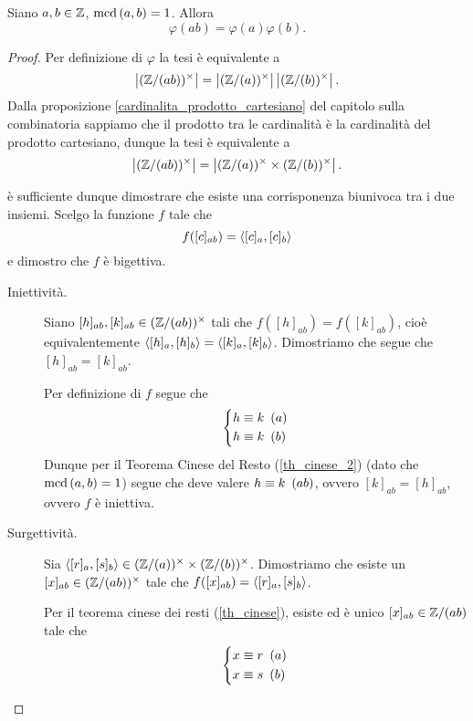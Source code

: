 \begin{proposition}
    Siano $a, b \in \mathbb{Z}$, $\operatorname{mcd}\left(a, b\right) = 1$. Allora \begin{equation}
        \varphi(ab) = \varphi(a)\varphi(b).
    \end{equation}
\end{proposition}
\begin{proof}
    Per definizione di $\varphi$ la tesi è equivalente a \[
        \left|(\mathbb{Z}/(ab))^{\times}\right| = \left|(\mathbb{Z}/(a))^{\times}\right|\left|(\mathbb{Z}/(b))^{\times}\right|.
    \]
    Dalla proposizione \ref{cardinalita_prodotto_cartesiano} del capitolo sulla combinatoria sappiamo che il prodotto tra le cardinalità è la cardinalità del prodotto cartesiano, dunque la tesi è equivalente a \[
        \left|(\mathbb{Z}/(ab))^{\times}\right| = \left|(\mathbb{Z}/(a))^{\times}\times(\mathbb{Z}/(b))^{\times}\right|.
    \]

    è sufficiente dunque dimostrare che esiste una corrisponenza biunivoca tra i due insiemi. Scelgo la funzione $f$ tale che \[
        f([c]_{ab}) = \left\langle [c]_a, [c]_b \right\rangle    
    \] e dimostro che $f$ è bigettiva.

    \begin{description}
        \item[Iniettività.] Siano $[h]_{ab}, [k]_{ab} \in (\mathbb{Z}/(ab))^{\times}$ tali che $f([h]_{ab}) = f([k]_{ab})$, cioè equivalentemente $\left\langle [h]_a, [h]_b \right\rangle = \left\langle [k]_a, [k]_b \right\rangle$. Dimostriamo che segue che $[h]_{ab} = [k]_{ab}$.
        
        Per definizione di $f$ segue che \[
            \left\{
            \begin{alignedat}{1}
                &h \equiv k \ \left(a\right)\\
                &h \equiv k \ \left(b\right)
            \end{alignedat}
            \right.   
        \] Dunque per il Teorema Cinese del Resto (\ref{th_cinese_2}) (dato che $\operatorname{mcd}\left(a, b\right) = 1$) segue che deve valere $h \equiv k \ \left(ab\right)$, ovvero $[k]_{ab} = [h]_{ab}$, ovvero $f$ è iniettiva.
        \item[Surgettività.] Sia $\left\langle [r]_a, [s]_b \right\rangle \in (\mathbb{Z}/(a))^{\times}\times(\mathbb{Z}/(b))^{\times}$. Dimostriamo che esiste un $[x]_{ab} \in (\mathbb{Z}/(ab))^{\times}$ tale che $f([x]_{ab}) = \left\langle [r]_a, [s]_b \right\rangle$.
        
        Per il teorema cinese dei resti (\ref{th_cinese}), esiste ed è unico $[x]_{ab} \in \mathbb{Z}/(ab)$ tale che \[
            \left\{
            \begin{alignedat}{1}
                &x \equiv r \ \left(a\right)\\
                &x \equiv s \ \left(b\right)
            \end{alignedat}
            \right.   
        \] 
        

\end{description}
\end{proof}
